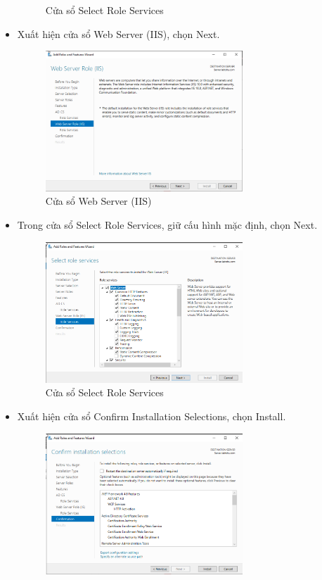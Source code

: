 \documentclass[13pt]{report}
\begin{document}
\begin{itemize}
\begin{figure}[htp]
			\caption{Cửa sổ Select Role Services}
		\end{figure}
		\item Xuất hiện cửa sổ Web Server (IIS), chọn Next.
		\begin{figure}[htp]
			\centering
			\includegraphics[width=0.7\textwidth]{image/Gui/ADCS/10.png}
			\caption{Cửa sổ Web Server (IIS)}
		\end{figure}
		\newpage
		\item Trong cửa sổ Select Role Services, giữ cấu hình mặc định, chọn Next.
		\begin{figure}[htp]
			\centering
			\includegraphics[width=0.7\textwidth]{image/Gui/ADCS/11.png}
			\caption{Cửa sổ Select Role Services}
		\end{figure}
		\item Xuất hiện cửa sổ Confirm Installation Selections, chọn Install.
		\begin{figure}[htp]
			\centering
			\includegraphics[width=0.7\textwidth]{image/Gui/ADCS/12.png}

\end{figure}
\end{itemize}
\end{document}
